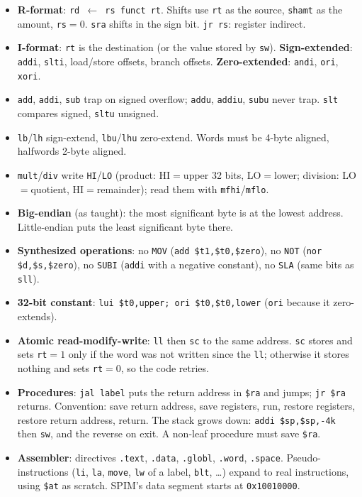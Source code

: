 \begin{itemize}[leftmargin=*]
  \item \textbf{R-format}: \texttt{rd $\leftarrow$ rs funct rt}. Shifts use
  \texttt{rt} as the source, \texttt{shamt} as the amount, \texttt{rs}$=0$.
  \texttt{sra} shifts in the sign bit. \texttt{jr rs}: register indirect.
  \item \textbf{I-format}: \texttt{rt} is the destination (or the value stored
  by \texttt{sw}). \textbf{Sign-extended}: \texttt{addi}, \texttt{slti},
  load/store offsets, branch offsets. \textbf{Zero-extended}: \texttt{andi},
  \texttt{ori}, \texttt{xori}.
  \item \texttt{add}, \texttt{addi}, \texttt{sub} trap on signed overflow;
  \texttt{addu}, \texttt{addiu}, \texttt{subu} never trap. \texttt{slt}
  compares signed, \texttt{sltu} unsigned.
  \item \texttt{lb}/\texttt{lh} sign-extend, \texttt{lbu}/\texttt{lhu}
  zero-extend. Words must be 4-byte aligned, halfwords 2-byte aligned.
  \item \texttt{mult}/\texttt{div} write \texttt{HI}/\texttt{LO} (product:
  HI$=$upper 32 bits, LO$=$lower; division: LO$=$quotient, HI$=$remainder);
  read them with \texttt{mfhi}/\texttt{mflo}.
  \item \textbf{Big-endian} (as taught): the most significant byte is at the
  lowest address. Little-endian puts the least significant byte there.
  \item \textbf{Synthesized operations}: no \texttt{MOV}
  (\texttt{add \$t1,\$t0,\$zero}), no \texttt{NOT} (\texttt{nor \$d,\$s,\$zero}),
  no \texttt{SUBI} (\texttt{addi} with a negative constant), no \texttt{SLA}
  (same bits as \texttt{sll}).
  \item \textbf{32-bit constant}: \texttt{lui \$t0,upper; ori \$t0,\$t0,lower}
  (\texttt{ori} because it zero-extends).
  \item \textbf{Atomic read-modify-write}: \texttt{ll} then \texttt{sc} to the
  same address. \texttt{sc} stores and sets \texttt{rt}$=1$ only if the word was
  not written since the \texttt{ll}; otherwise it stores nothing and sets
  \texttt{rt}$=0$, so the code retries.
  \item \textbf{Procedures}: \texttt{jal label} puts the return address in
  \texttt{\$ra} and jumps; \texttt{jr \$ra} returns. Convention: save return
  address, save registers, run, restore registers, restore return address,
  return. The stack grows down: \texttt{addi \$sp,\$sp,-4k} then
  \texttt{sw}, and the reverse on exit. A non-leaf procedure must save
  \texttt{\$ra}.
  \item \textbf{Assembler}: directives \texttt{.text}, \texttt{.data},
  \texttt{.globl}, \texttt{.word}, \texttt{.space}. Pseudo-instructions
  (\texttt{li}, \texttt{la}, \texttt{move}, \texttt{lw} of a label, \texttt{blt},
  \dots) expand to real instructions, using \texttt{\$at} as scratch. SPIM's
  data segment starts at \texttt{0x10010000}.
\end{itemize}

